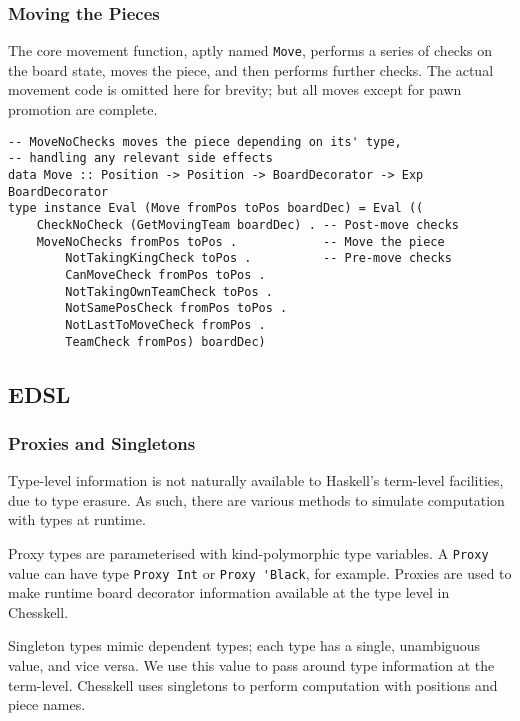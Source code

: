 \documentclass[12pt, a4paper]{scrartcl}
\begin{document}
\subsubsection{Moving the Pieces}

The core movement function, aptly named \lstinline{Move}, performs a series of checks on the board state, moves the piece, and then performs further checks. The actual movement code is omitted here for brevity; but all moves except for pawn promotion are complete.

\begin{lstlisting}
-- MoveNoChecks moves the piece depending on its' type,
-- handling any relevant side effects
data Move :: Position -> Position -> BoardDecorator -> Exp BoardDecorator
type instance Eval (Move fromPos toPos boardDec) = Eval ((
    CheckNoCheck (GetMovingTeam boardDec) . -- Post-move checks
    MoveNoChecks fromPos toPos .            -- Move the piece
        NotTakingKingCheck toPos .          -- Pre-move checks
        CanMoveCheck fromPos toPos .
        NotTakingOwnTeamCheck toPos .
        NotSamePosCheck fromPos toPos .
        NotLastToMoveCheck fromPos .
        TeamCheck fromPos) boardDec)
\end{lstlisting}

\subsection{EDSL}

\subsubsection{Proxies and Singletons}

Type-level information is not naturally available to Haskell's term-level facilities, due to type erasure. As such, there are various methods to simulate computation with types at runtime.

Proxy types are parameterised with kind-polymorphic type variables\cite{yorgey2012giving}. A \lstinline{Proxy} value can have type \lstinline{Proxy Int} or \lstinline{Proxy 'Black}, for example. Proxies are used to make runtime board decorator information available at the type level in Chesskell.

Singleton types mimic dependent types\cite{singletons}; each type has a single, unambiguous value, and vice versa. We use this value to pass around type information at the term-level. Chesskell uses singletons to perform computation with positions and piece names.
\end{document}
